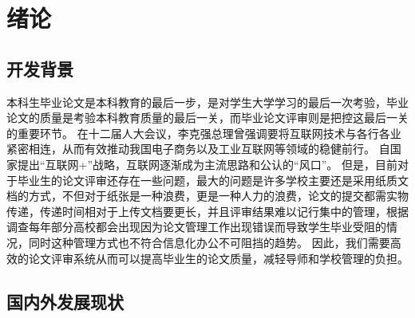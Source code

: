 
\chapter{绪论}
\label{chap02}
\section{开发背景}

本科生毕业论文是本科教育的最后一步，是对学生大学学习的最后一次考验，毕业论文的质量是考验本科教育质量的最后一关\cite{.2019}，而毕业论文评审则是把控这最后一关的重要环节。
在十二届人大会议，李克强总理曾强调要将互联网技术与各行各业紧密相连，从而有效推动我国电子商务以及工业互联网等领域的稳健前行\cite{.2020c}。
自国家提出“互联网+”战略，互联网逐渐成为主流思路和公认的“风口”\cite{.20183}。 
但是，目前对于毕业生的论文评审还存在一些问题，最大的问题是许多学校主要还是采用纸质文档的方式，不但对于纸张是一种浪费，更是一种人力的浪费，论文的提交都需实物传递，传递时间相对于上传文档要更长，并且评审结果难以记行集中的管理\cite{.2017e}，根据调查每年部分高校都会出现因为论文管理工作出现错误而导致学生毕业受阻的情况\cite{.2018}，同时这种管理方式也不符合信息化办公不可阻挡的趋势。
因此，我们需要高效的论文评审系统从而可以提高毕业生的论文质量，减轻导师和学校管理的负担\cite{.2019d}。


\section{国内外发展现状}

